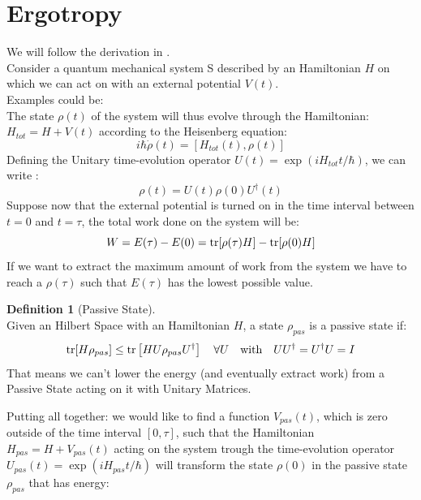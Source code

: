 \documentclass[12pt,a4paper]{book}
\theoremstyle{definition}
\newtheorem{definition}{Definition}[section]
\begin{document}
\section{Ergotropy}
We will follow the derivation in \cite{allahverdyan2004maximal}.\\
Consider a quantum mechanical system S described by an Hamiltonian $H$ on which we can act on with an external potential $V(t)$. \\
Examples could be:   \\
The state $\rho(t)$ of the system will thus evolve through the Hamiltonian: $H_{tot}=H+V(t)$ according to the Heisenberg equation: 
\begin{equation}\label{eq:heisen}
i \hbar \dot{\rho}(t)=[H_{tot}(t), \rho(t)]
\end{equation}
Defining the Unitary time-evolution operator $U(t) = \exp(iH_{tot}t/\hbar)$, we can write :
\begin{equation}\label{eq:time_evol}
	\rho(t)=U(t)\rho(0) U^\dagger(t)
\end{equation} 
Suppose now that the external potential is turned on in the time interval between $t=0$ and $t=\tau$, the total work done on the system will be:
\begin{equation}
	W=E(\tau)-E(0)=\tr[\rho(\tau) H]-\tr[\rho(0) H]
\end{equation}
If we want to extract the maximum amount of work from the system we have to reach a $\rho(\tau)$ such that $E(\tau)$ has the lowest possible value.\\
\begin{definition}[Passive State]\label{eq:def_passivestate} \cite{pusz1978}\\
Given an Hilbert Space with an Hamiltonian $H$, a state $\rho_{pas}$ is a passive state if:
	 \begin{equation}
		\tr[H \rho_{pas}] \leq \tr\left[H U \rho_{pas} U^{\dagger}\right] \quad \forall U \quad \text{with} \quad U U^\dagger=U^\dagger U = I
	\end{equation}
That means we can't lower the energy (and eventually extract work) from a Passive State acting on it with Unitary Matrices.
\end{definition}
Putting all together: we would like to find a function $V_{pas}(t)$, which is zero outside of the time interval $[0,\tau]$, such that the Hamiltonian $H_{pas}=H+V_{pas}(t)$ acting on the system trough the time-evolution operator $U_{pas}(t) = \exp(iH_{pas}t/\hbar)$ will transform the state $\rho(0)$ in the passive state $\rho_{pas}$ that has energy:
\end{document}
